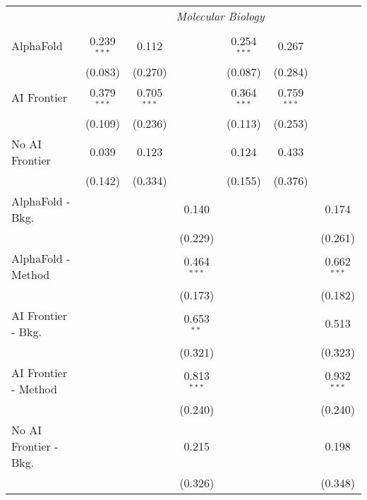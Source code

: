 \begin{tabular}{lcccccc}
 & \multicolumn{6}{c}{\textit{Molecular Biology}} \\ \\
   AlphaFold               & 0.239$^{***}$ & 0.112         &               & 0.254$^{***}$ & 0.267         &   \\   
                           & (0.083)       & (0.270)       &               & (0.087)       & (0.284)       &   \\   
   AI Frontier             & 0.379$^{***}$ & 0.705$^{***}$ &               & 0.364$^{***}$ & 0.759$^{***}$ &   \\   
                           & (0.109)       & (0.236)       &               & (0.113)       & (0.253)       &   \\   
   No AI Frontier          & 0.039         & 0.123         &               & 0.124         & 0.433         &   \\   
                           & (0.142)       & (0.334)       &               & (0.155)       & (0.376)       &   \\   
   AlphaFold - Bkg.        &               &               & 0.140         &               &               & 0.174\\   
                           &               &               & (0.229)       &               &               & (0.261)\\   
   AlphaFold - Method      &               &               & 0.464$^{***}$ &               &               & 0.662$^{***}$\\   
                           &               &               & (0.173)       &               &               & (0.182)\\   
   AI Frontier - Bkg.      &               &               & 0.653$^{**}$  &               &               & 0.513\\   
                           &               &               & (0.321)       &               &               & (0.323)\\   
   AI Frontier - Method    &               &               & 0.813$^{***}$ &               &               & 0.932$^{***}$\\   
                           &               &               & (0.240)       &               &               & (0.240)\\   
   No AI Frontier - Bkg.   &               &               & 0.215         &               &               & 0.198\\   
                           &               &               & (0.326)       &               &               & (0.348)\\   

\end{tabular}
